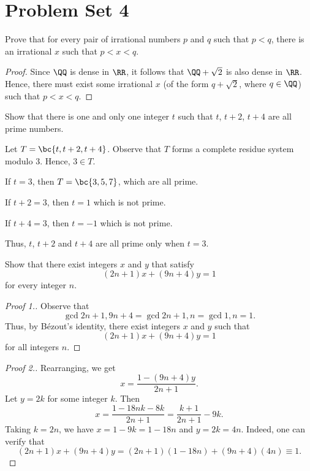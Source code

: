 \section{Problem Set 4}

\begin{problem}
    Prove that for every pair of irrational numbers $p$ and $q$ such that $p < q$, there is an irrational $x$ such that $p < x < q$.
\end{problem}
\begin{proof}
    Since $\QQ$ is dense in $\RR$, it follows that $\QQ + \sqrt2$ is also dense in $\RR$. Hence, there must exist some irrational $x$ (of the form $q + \sqrt2$, where $q \in \QQ$) such that $p < x < q$.
\end{proof}

\begin{problem}
    Show that there is one and only one integer $t$ such that $t$, $t+2$, $t+4$ are all prime numbers.
\end{problem}
\begin{solution}
    Let $T = \bc{t, t+2, t+4}$. Observe that $T$ forms a complete residue system modulo 3. Hence, $3 \in T$.

     If $t = 3$, then $T = \bc{3, 5, 7}$, which are all prime.

     If $t + 2 = 3$, then $t = 1$ which is not prime.

     If $t + 4 = 3$, then $t = -1$ which is not prime.

    Thus, $t$, $t+2$ and $t+4$ are all prime only when $t = 3$.
\end{solution}

\begin{problem}
    Show that there exist integers $x$ and $y$ that satisfy \[(2n + 1) x + (9n + 4)y = 1\] for every integer $n$.
\end{problem}
\begin{proof}[Proof 1.]
    Observe that \[\gcd{2n+1, 9n+4} = \gcd{2n+1, n} = \gcd{1, n} = 1.\] Thus, by B\'ezout's identity, there exist integers $x$ and $y$ such that \[(2n + 1) x + (9n + 4)y = 1\] for all integers $n$.
\end{proof}
\begin{proof}[Proof 2.]
    Rearranging, we get \[x = \frac{1 - (9n+4)y}{2n+1}.\] Let $y = 2k$ for some integer $k$. Then \[x = \frac{1 - 18nk - 8k}{2n+1} = \frac{k + 1}{2n+1} - 9k.\] Taking $k = 2n$, we have $x = 1 - 9k = 1-18n$ and $y = 2k = 4n$. Indeed, one can verify that \[(2n+1)x + (9n+4)y = (2n+1)(1-18n) + (9n+4)(4n) \equiv 1.\]
\end{proof}

